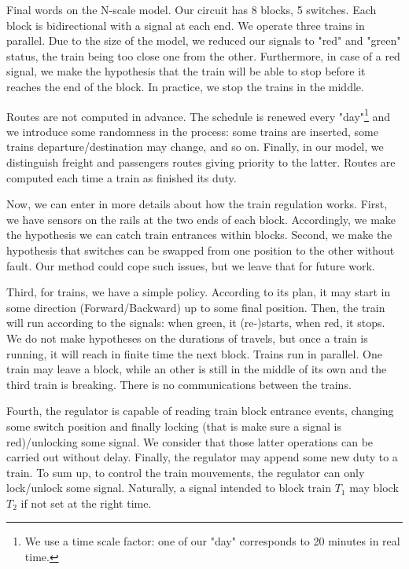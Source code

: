 \documentclass[runningheads]{llncs}
\begin{document}
Final words on the N-scale model. Our circuit has 8 blocks, 5 switches. Each block is bidirectional with a signal at each end.  We operate  three trains in parallel. Due to the size of the model, we reduced our signals  to "red" and "green" status, the train being too close one from the other. Furthermore, in case of a red signal, we make the hypothesis that the train will be able to stop before it reaches the end of the block. In practice, we stop the trains in the middle. 


Routes are not computed in advance. The schedule is renewed every "day"\footnote{We use a time scale factor: one of our "day" corresponds to 20 minutes in real time.}  and we introduce some randomness in the process: some trains are inserted, some trains departure/destination may change, and so on. Finally, in our model, we distinguish freight and  passengers routes giving priority to the latter. Routes are computed each time a train as finished its duty. 
 
 Now, we can enter in more details about how the train regulation works. First, we have sensors on the rails at the two ends of each block. Accordingly, we make the hypothesis we can catch train entrances within blocks. Second, we make the hypothesis that switches can be swapped from one position to the other without fault. Our method could cope such issues, but we leave that for future work. 
 
  Third, for trains, we have a simple policy.  According to its plan, it may start in some direction (Forward/Backward) up to some final position. Then, the train will run according to the signals: when green, it (re-)starts, when red, it stops.  We do not make hypotheses on the durations of travels, but once a train is running, it will reach in finite time the next block. Trains run in parallel. One train may leave a block, while an other is still in the middle of its own and the third train is breaking. There is no communications between the trains.

Fourth,  the regulator is capable of reading train block entrance events, changing some switch position and finally locking (that is make sure a signal is red)/unlocking some signal. We consider that those latter operations can be carried out without delay. Finally, the regulator may append some new duty to a train. To sum up, to control the train mouvements, the regulator can only lock/unlock some signal. Naturally, a signal intended to block train $T_1$ may block $T_2$ if not set at the right time.   
 
\end{document}
